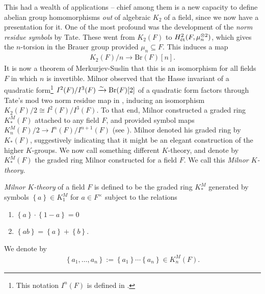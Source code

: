 \documentclass[11pt,openany]{book}
\providecommand{\Br}{\mathrm{Br}}
\begin{document}
This had a wealth of applications -- chief among them is a new capacity to define abelian group homomorphisms \emph{out} of algebraic $K_2$ of a field, since we now have a presentation for it. One of the most profound was the development of the \emph{norm residue symbols} by Tate. These went from $K_2(F)$ to $H^2_{\text{\'{e}t}}(F,\mu_n^{\otimes2})$, which gives the $n$-torsion in the Brauer group provided $\mu_n \subseteq F$. This induces a map
\begin{equation}\label{eqn:norm-residue}
\begin{aligned}
    K_2(F)/n \to \Br(F)[n].
\end{aligned}
\end{equation}
It is now a theorem of Merkurjev-Suslin that this is an isomorphism for all fields $F$ in which $n$ is invertible. Milnor observed that the Hasse invariant of a quadratic form\footnote{This notation $I^n(F)$ is defined in .} $I^2(F)/I^3(F) \xto{\sim} \Br(F)[2]$ of a quadratic form factors through Tate's mod two norm residue map in , inducing an isomorphism $K_2(F)/2 \cong I^2(F)/I^3(F)$. To that end, Milnor constructed a graded ring $K_\ast^M(F)$ attached to any field $F$, and provided symbol maps $K_n^M(F)/2 \to I^n(F)/I^{n+1}(F)$ (see ). Milnor denoted his graded ring by $K_\ast(F)$, suggestively indicating that it might be an elegant construction of the higher $K$-groups. We now call something different $K$-theory, and denote by $K_\ast^M(F)$ the graded ring Milnor constructed for a field $F$. We call this \emph{Milnor $K$-theory}.


\begin{definition}
\textit{Milnor $K$-theory} of a field $F$ is defined to be the graded ring $K_\ast^M$ generated by symbols $\left\{ a \right\}\in K_1^M$ for $a\in F^\times$ subject to the relations
\begin{enumerate}
    \item[\textbf{(M1)}] $\left\{ a \right\}\cdot \left\{ 1-a \right\} = 0$
    \item[\textbf{(M2)}] $\left\{ ab \right\} = \left\{ a \right\} + \left\{ b \right\}$.
\end{enumerate}
\end{definition}

\begin{notation} We denote by
\begin{align*}
    \left\{ a_1, \ldots, a_n \right\} := \left\{ a_1 \right\} \cdots \left\{ a_n \right\}\in K_n^M(F).
\end{align*}
\end{notation}
\end{document}
